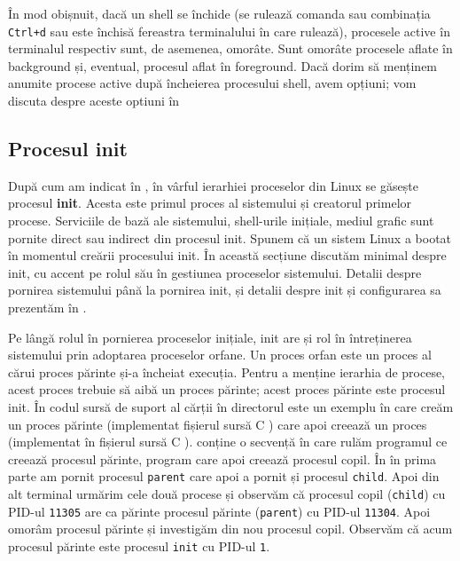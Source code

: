 În mod obișnuit, dacă un shell se închide (se rulează comanda  sau
combinația \texttt{Ctrl+d} sau este închisă fereastra terminalului în care rulează),
procesele active în terminalul respectiv sunt, de asemenea, omorâte. Sunt
omorâte procesele aflate în background și, eventual, procesul aflat în
foreground. Dacă dorim să menținem anumite procese active după încheierea
procesului shell, avem opțiuni; vom discuta despre aceste optiuni în

\subsection{Procesul init}
\label{sec:process-ierarhie-init}

După cum am indicat în ,
în vârful ierarhiei proceselor din Linux se găsește procesul \textbf{init}. Acesta este
primul proces al sistemului și creatorul primelor procese. Serviciile de bază
ale sistemului, shell-urile inițiale, mediul grafic sunt pornite direct sau
indirect din procesul init. Spunem că un sistem Linux a bootat în momentul
creării procesului init. În această secțiune discutăm minimal despre init, cu
accent pe rolul său în gestiunea proceselor sistemului. Detalii despre pornirea
sistemului până la pornirea init, și detalii despre init și configurarea sa
prezentăm în .

Pe lângă rolul în pornierea proceselor inițiale, init are și rol în întreținerea
sistemului prin adoptarea proceselor orfane. Un proces orfan este un proces al
cărui proces părinte și-a încheiat execuția. Pentru a menține ierarhia de
procese, acest proces trebuie să aibă un proces părinte; acest proces părinte
este procesul init. În codul sursă de suport al cărții în directorul  este un exemplu în care creăm un proces părinte (implementat fișierul sursă C ) care apoi creează un proces (implementat în fișierul sursă C ).  conține o secvență în care rulăm programul ce creează procesul părinte, program care apoi creează procesul copil.
În  în prima parte am pornit procesul \texttt{parent} care apoi a pornit și procesul \texttt{child}. Apoi din alt terminal urmărim cele două procese și observăm că procesul copil (\texttt{child}) cu PID-ul \texttt{11305} are ca părinte procesul părinte (\texttt{parent}) cu PID-ul \texttt{11304}. Apoi omorâm procesul părinte și investigăm din nou procesul copil. Observăm că acum procesul părinte este procesul \texttt{init} cu PID-ul \texttt{1}.

